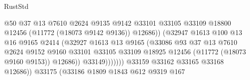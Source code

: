 \begin{lexlean}{RustStd}
\begin{coremodule}
                                              @50
                                              @37
                                              @13
                                              @7610
                                              @2624
                                              @9135
                                              @9142
                                              @33101
                                              @33105
                                              @33109
                                              @18800
                                              @12456
                                              (@11772 (@18073 @9142 @9136))
                                              @12686))
                                          (@32947
                                            @1613
                                            @100
                                            @13
                                            @16
                                            @9165
                                            @2414
                                            (@32927
                                              @1613
                                              @13
                                              @9165
                                              (@33086
                                                @93
                                                @37
                                                @13
                                                @7610
                                                @2624
                                                @9152
                                                @9160
                                                @33101
                                                @33105
                                                @33109
                                                @18925
                                                @12456
                                                (@11772 (@18073 @9160 @9153))
                                                @12686))
                                            @33149)))))))
                              @33159
                              @33162
                              @33165
                              @33168
                              @12686))
                          @33175
                          (@33186
                            @1809
                            @1843
                            @612
                            @9319
                            @167

\end{coremodule}
\end{lexlean}
